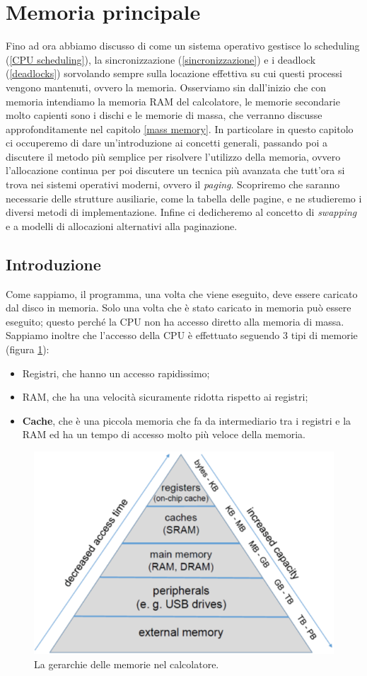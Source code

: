 \section{Memoria principale}\label{main memory}
Fino ad ora abbiamo discusso di come un sistema operativo gestisce lo scheduling (\ref{CPU scheduling}), la sincronizzazione (\ref{sincronizzazione}) e i deadlock (\ref{deadlocks}) sorvolando sempre sulla locazione effettiva su cui questi processi vengono mantenuti, ovvero la memoria. Osserviamo sin dall'inizio che con memoria intendiamo la memoria RAM del calcolatore, le memorie secondarie molto capienti sono i dischi e le memorie di massa, che verranno discusse approfonditamente nel capitolo \ref{mass memory}. In particolare in questo capitolo ci occuperemo di dare un'introduzione ai concetti generali, passando poi a discutere il metodo più semplice per risolvere l'utilizzo della memoria, ovvero l'allocazione continua per poi discutere un tecnica più avanzata che tutt'ora si trova nei sistemi operativi moderni, ovvero il \textit{paging}. Scopriremo che saranno necessarie delle strutture ausiliarie, come la tabella delle pagine, e ne studieremo i diversi metodi di implementazione. Infine ci dedicheremo al concetto di \textit{swapping} e a modelli di allocazioni alternativi alla paginazione.

\subsection{Introduzione}
Come sappiamo, il programma, una volta che viene eseguito, deve essere caricato dal disco in memoria. Solo una volta che è stato caricato in memoria può essere eseguito; questo perché la CPU non ha accesso diretto alla memoria di massa. Sappiamo inoltre che l'accesso della CPU è effettuato seguendo 3 tipi di memorie (figura \ref{fig:memory_hierarchy}):
\vspace{-5px}
\begin{itemize}
\setlength{\itemsep}{-.15 em}
    \item Registri, che hanno un accesso rapidissimo;
    \item RAM, che ha una velocità sicuramente ridotta rispetto ai registri;
    \item \textbf{Cache}, che è una piccola memoria che fa da intermediario tra i registri e la RAM ed ha un tempo di accesso molto più veloce della memoria.
\end{itemize}
\begin{figure}[h]
    \centering
    \includegraphics[width = .5\textwidth]{../res/imgs/main memory/memory_hierarchy.png}
    \caption{La gerarchie delle memorie nel calcolatore.}
    \label{fig:memory_hierarchy}
\end{figure}

